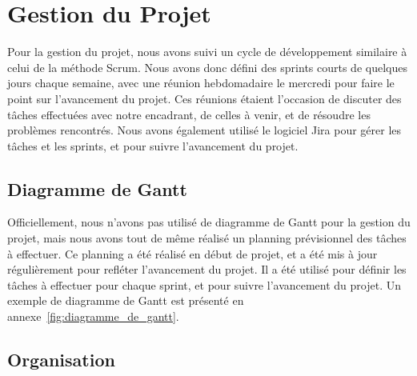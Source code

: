 \section{Gestion du Projet}

Pour la gestion du projet, nous avons suivi un cycle de développement similaire à celui de la méthode Scrum. 
Nous avons donc défini des sprints courts de quelques jours chaque semaine, avec une réunion hebdomadaire
le mercredi pour faire le point sur l'avancement du projet. 
Ces réunions étaient l'occasion de discuter des tâches effectuées avec notre encadrant, de celles à venir, et de résoudre les problèmes rencontrés.
Nous avons également utilisé le logiciel Jira pour gérer les tâches et les sprints, et pour suivre l'avancement du projet.

\subsection{Diagramme de Gantt}
Officiellement, nous n'avons pas utilisé de diagramme de Gantt pour la gestion du projet, mais nous avons tout de même
réalisé un planning prévisionnel des tâches à effectuer.
Ce planning a été réalisé en début de projet, et a été mis à jour régulièrement pour refléter l'avancement du projet.
Il a été utilisé pour définir les tâches à effectuer pour chaque sprint, et pour suivre l'avancement du projet.
Un exemple de diagramme de Gantt est présenté en annexe~\ref{fig:diagramme_de_gantt}.


\subsection{Organisation}

